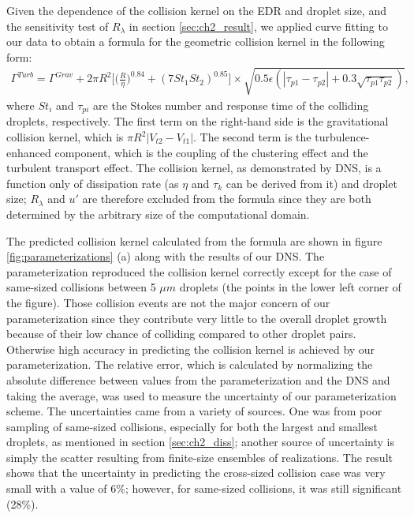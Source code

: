 Given the dependence of the collision kernel on the EDR and droplet size, and the sensitivity test of $R_\lambda$ in section \ref{sec:ch2_result}, we applied curve fitting to our data to obtain a formula for the geometric collision kernel in the following form:
\begin{multline}
\Gamma^{Turb}=\Gamma^{Grav}+ 2\pi R^2 \Big[ \big(\frac{R}{\eta}\big)^{0.84}+(7 St_1 St_2)^{0.85}\Big]
 \times \sqrt{0.5\epsilon(|\tau_{p1}-\tau_{p2}|+0.3\sqrt{\tau_{p1}\tau_{p2}})}, \label{eqn:paragamma}
\end{multline}
where $St_i$ and $\tau_{pi}$ are the Stokes number and response time of the colliding droplets, respectively. The first term on the right-hand side is the gravitational collision kernel, which is $\pi R^2|V_{t2}-V_{t1}|$. The second term is the turbulence-enhanced component, which is the coupling of the clustering effect and the turbulent transport effect. The collision kernel, as demonstrated by DNS, is a function only of dissipation rate (as $\eta$ and $\tau_k$ can be derived from it) and droplet size; $R_\lambda$ and $u\prime$ are therefore excluded from the formula since they are both determined by the arbitrary size of the computational domain.

The predicted collision kernel calculated from the formula are shown in figure \ref{fig:parameterizations} (a) along with the results of our DNS. The parameterization reproduced the collision kernel correctly except for the case of same-sized collisions between 5 $\mu m$ droplets (the points in the lower left corner of the figure). Those collision events are not the major concern of our parameterization since they contribute very little to the overall droplet growth because of their low chance of colliding compared to other droplet pairs. Otherwise high accuracy in predicting the collision kernel is achieved by our parameterization. The relative error, which is calculated by normalizing the absolute difference between values from the parameterization and the DNS and taking the average, was used to measure the uncertainty of our parameterization scheme. The uncertainties came from a variety of sources. One was from poor sampling of same-sized collisions, especially for both the largest and smallest droplets, as mentioned in section \ref{sec:ch2_diss}; another source of uncertainty is simply the scatter resulting from finite-size ensembles of realizations.  The result shows that the uncertainty in predicting the cross-sized collision case was very small with a value of 6\%; however, for same-sized collisions, it was still significant (28\%). 


